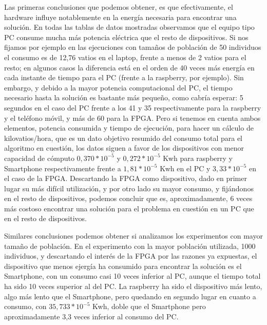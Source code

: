 Las primeras conclusiones que podemos obtener, es que efectivamente, el hardware influye notablemente en la energía necesaria para encontrar una solución.  En todas las 
tablas de datos mostradas observamos que el equipo tipo PC consume mucha más potencia eléctrica que el resto de dispositivos.  Si nos fijamos por ejemplo en las ejecuciones con tamaños de población de 50 individuos el consumo es de 12,76 vatios en el laptop, frente a menos de 2 vatios para el resto;  en algunos casos la diferencia está en el orden de 40 veces más energía en cada instante de tiempo para el PC (frente a la raspberry, por ejemplo).  Sin embargo, y debido a la mayor potencia computacional del PC, el tiempo necesario hasta la solución es bastante más pequeño, como cabría esperar:  5 segundos en el caso del PC frente a los 41 y 35 respectivamente para la raspberry y el teléfono móvil, y más de 60 para la FPGA.  Pero si tenemos en cuenta ambos elementos, potencia consumida y tiempo de ejecución, para hacer un cálculo de kilovatios/hora, que es un dato objetivo resumido del consumo total para el algoritmo en cuestión, 
los datos siguen a favor de los dispositivos con menor capacidad de cómputo $0,370*10^{-5}$ y $0,272*10^{-5}$ Kwh para raspberry y Smartphone respectivamente frente a $1,81*10^{-5}$ Kwh en el PC y $3,33*10^{-5}$ en el caso de la FPGA.  Descartando la FPGA como dispositivo, dado en primer lugar 
su más difícil utilización, y por otro lado su mayor consumo, y fijándonos en el resto de dispositivos, podemos concluir que es, aproximadamente, 6 veces más costoso encontrar una solución para el problema en cuestión en un PC que en el resto de dispositivos.  

Similares conclusiones podemos obtener si analizamos los experimentos con mayor tamaño de población.  En el experimento con la mayor población utilizada, 1000 individuos, y descartando el interés de la FPGA por las razones ya expuestas, el
dispositivo que menos ejergía ha consumido para encontrar la solución es el Smartphone, con un consumo casi 10 veces inferior al PC, aunque el tiempo 
total ha sido 10 veces superior al del PC.  La raspberry ha sido el dispositivo más lento, algo más lento que el Smartphone, pero quedando en segundo lugar en 
cuanto a consumo, con $35,733*10^{-5}$ Kwh, doble que el Smartphone pero aproximadamente 3,3 veces inferior al consumo del PC.

